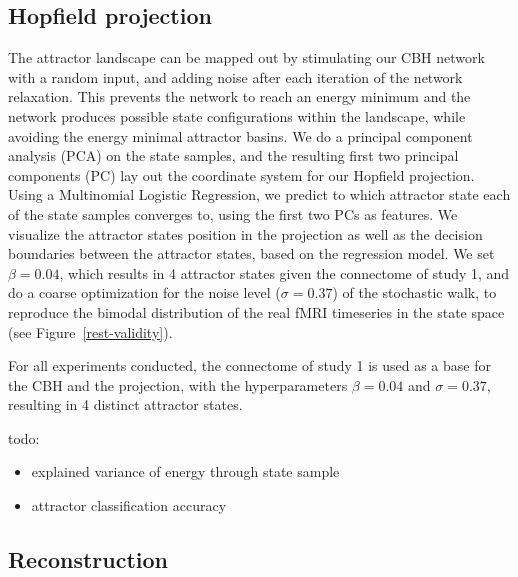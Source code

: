 \documentclass{article}
\begin{document}
\subsection{Hopfield projection}\label{Hopfield projection}

The attractor landscape can be mapped out by stimulating our CBH network with a random input, and adding noise after
each iteration of the network relaxation. This prevents the network to reach an energy minimum and the network
produces possible state configurations within the landscape, while avoiding the energy minimal attractor basins.
We do a principal component analysis (PCA) on the state samples, and the resulting first two principal components (PC)
lay out the coordinate system for our Hopfield projection. Using a Multinomial Logistic Regression, we predict to which
attractor state each of the state samples converges to, using the first two PCs as features. We visualize the attractor
states position in the projection as well as the decision boundaries between the attractor states, based on the
regression model. We set $\beta = 0.04$, which results in 4 attractor states given the connectome of study 1, and do a
coarse optimization for the noise level ($\sigma=0.37$) of the stochastic walk, to reproduce the bimodal distribution
of the real fMRI timeseries in the state space (see Figure~\ref{rest-validity}).

For all experiments conducted, the connectome of study 1 is used as a base for the CBH and the projection, with the
hyperparameters $\beta = 0.04$ and $\sigma=0.37$, resulting in 4 distinct attractor states.

todo:

\begin{itemize}
\item explained variance of energy through state sample
\item attractor classification accuracy
\end{itemize}

\subsection{Reconstruction}\label{Reconstruction}
\end{document}
